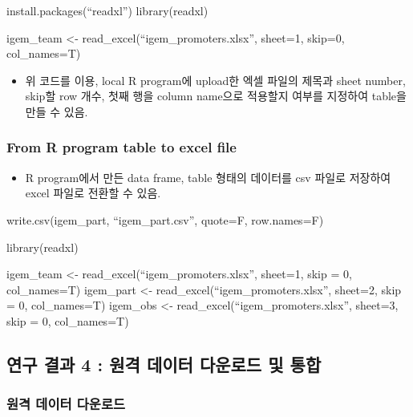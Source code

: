 \documentclass[
]{article}
\providecommand{\tightlist}{%
  \setlength{\itemsep}{0pt}\setlength{\parskip}{0pt}}
\begin{document}
install.packages(``readxl'') library(readxl)

igem\_team \textless- read\_excel(``igem\_promoters.xlsx'', sheet=1,
skip=0, col\_names=T)

\begin{itemize}
\tightlist
\item
  위 코드를 이용, local R program에 upload한 엑셀 파일의 제목과 sheet
  number, skip할 row 개수, 첫째 행을 column name으로 적용할지 여부를
  지정하여 table을 만들 수 있음.
\end{itemize}

\hypertarget{from-r-program-table-to-excel-file}{%
\subsubsection{From R program table to excel
file}\label{from-r-program-table-to-excel-file}}

\begin{itemize}
\tightlist
\item
  R program에서 만든 data frame, table 형태의 데이터를 csv 파일로
  저장하여 excel 파일로 전환할 수 있음.
\end{itemize}

write.csv(igem\_part, ``igem\_part.csv'', quote=F, row.names=F)

library(readxl)

igem\_team \textless- read\_excel(``igem\_promoters.xlsx'', sheet=1,
skip = 0, col\_names=T) igem\_part \textless-
read\_excel(``igem\_promoters.xlsx'', sheet=2, skip = 0, col\_names=T)
igem\_obs \textless- read\_excel(``igem\_promoters.xlsx'', sheet=3, skip
= 0, col\_names=T)

\hypertarget{uxc5f0uxad6c-uxacb0uxacfc-4-uxc6d0uxaca9-uxb370uxc774uxd130-uxb2e4uxc6b4uxb85cuxb4dc-uxbc0f-uxd1b5uxd569}{%
\subsection{연구 결과 4 : 원격 데이터 다운로드 및
통합}\label{uxc5f0uxad6c-uxacb0uxacfc-4-uxc6d0uxaca9-uxb370uxc774uxd130-uxb2e4uxc6b4uxb85cuxb4dc-uxbc0f-uxd1b5uxd569}}

\hypertarget{uxc6d0uxaca9-uxb370uxc774uxd130-uxb2e4uxc6b4uxb85cuxb4dc}{%
\subsubsection{원격 데이터
다운로드}\label{uxc6d0uxaca9-uxb370uxc774uxd130-uxb2e4uxc6b4uxb85cuxb4dc}}
\end{document}
